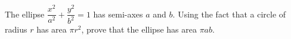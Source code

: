The ellipse $\dfrac{x^2}{a^2}+\dfrac{y^2}{b^2}=1$ has semi-axes $a$ and $b$. Using the fact that a circle of radius $r$ has area $\pi r^2$, prove that the ellipse has area $\pi ab$.
